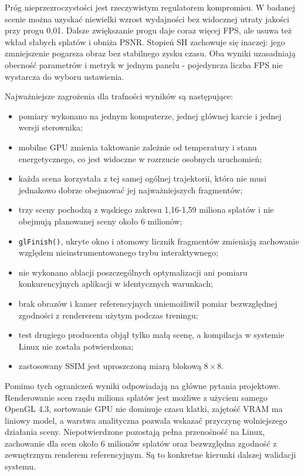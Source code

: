 Próg nieprzezroczystości jest rzeczywistym regulatorem kompromisu. W badanej scenie można uzyskać niewielki wzrost wydajności bez widocznej utraty jakości przy progu 0,01. Dalsze zwiększanie progu daje coraz więcej FPS, ale usuwa też wkład słabych splatów i obniża PSNR. Stopień SH zachowuje się inaczej: jego zmniejszenie pogarsza obraz bez stabilnego zysku czasu. Oba wyniki uzasadniają obecność parametrów i metryk w jednym panelu - pojedyncza liczba FPS nie wystarcza do wyboru ustawienia.

Najważniejsze zagrożenia dla trafności wyników są następujące:
\begin{itemize}
  \item pomiary wykonano na jednym komputerze, jednej głównej karcie i jednej
        wersji sterownika;
  \item mobilne GPU zmienia taktowanie zależnie od temperatury i stanu
        energetycznego, co jest widoczne w rozrzucie osobnych uruchomień;
  \item każda scena korzystała z tej samej ogólnej trajektorii, która nie musi
        jednakowo dobrze obejmować jej najważniejszych fragmentów;
  \item trzy sceny pochodzą z wąskiego zakresu 1,16-1,59 miliona splatów i nie
        obejmują planowanej sceny około 6 milionów;
  \item \texttt{glFinish()}, ukryte okno i atomowy licznik fragmentów zmieniają
        zachowanie względem nieinstrumentowanego trybu interaktywnego;
  \item nie wykonano ablacji poszczególnych optymalizacji ani pomiaru
        konkurencyjnych aplikacji w identycznych warunkach;
  \item brak obrazów i kamer referencyjnych uniemożliwił pomiar bezwzględnej
        zgodności z rendererem użytym podczas treningu;
  \item test drugiego producenta objął tylko małą scenę, a kompilacja w
        systemie Linux nie została potwierdzona;
  \item zastosowany SSIM jest uproszczoną miarą blokową $8\times8$.
\end{itemize}

Pomimo tych ograniczeń wyniki odpowiadają na główne pytania projektowe. Renderowanie scen rzędu miliona splatów jest możliwe z użyciem samego OpenGL 4.3, sortowanie GPU nie dominuje czasu klatki, zajętość VRAM ma liniowy model, a warstwa analityczna pozwala wskazać przyczynę wolniejszego działania sceny. Niepotwierdzone pozostają pełna przenośność na Linux, zachowanie dla scen około 6 milionów splatów oraz bezwzględna zgodność z zewnętrznym renderem referencyjnym. Są to konkretne kierunki dalszej walidacji systemu.

